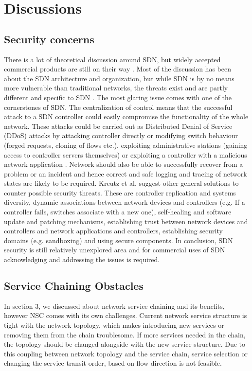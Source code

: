 \section{Discussions}

\subsection{Security concerns}

There is a lot of theoretical discussion around SDN, but widely accepted commercial products are still on their way \cite{Sorensen12}. Most of the discussion has been about the SDN architecture and organization, but while SDN is by no means more vulnerable than traditional networks, the threats exist and are partly different and specific to SDN \cite{Kreutz13}. The most glaring issue comes with one of the cornerstones of SDN. The centralization of control means that the successful attack to a SDN controller could easily compromise the functionality of the whole network. These attacks could be carried out as Distributed Denial of Service (DDoS) attacks by attacking controller directly or modifying switch behaviour (forged requests, cloning of flows etc.), exploiting administrative stations (gaining access to controller servers themselves) or exploiting a controller with a malicious network application  \cite{Kreutz13}. Network should also be able to successfully recover from a problem or an incident and hence correct and safe logging and tracing of network states are likely to be required.
Kreutz et al. suggest other general solutions to counter possible security threats. These are controller replication and systems diversity, dynamic associations between network devices and controllers (e.g. If a controller fails, switches associate with a new one), self-healing and software update and patching mechanisms, establishing trust between network devices and controllers and network applications and controllers, establishing security domains (e.g. sandboxing) and using secure components. In conclusion, SDN security is still relatively unexplored area and for commercial uses of SDN acknowledging and addressing the issues is required.

\subsection{Service Chaining Obstacles}

In section 3, we discussed about network service chaining and its benefits, however NSC comes with its own challenges. Current network service structure is tight with the network topology, which makes introducing new services or removing them from the chain troublesome. If more services needed in the chain, the topology should be changed alongside with the new service structure. Due to this coupling between network topology and the service chain, service selection or changing the service transit order, based on flow direction is not feasible. \cite{QN14}

